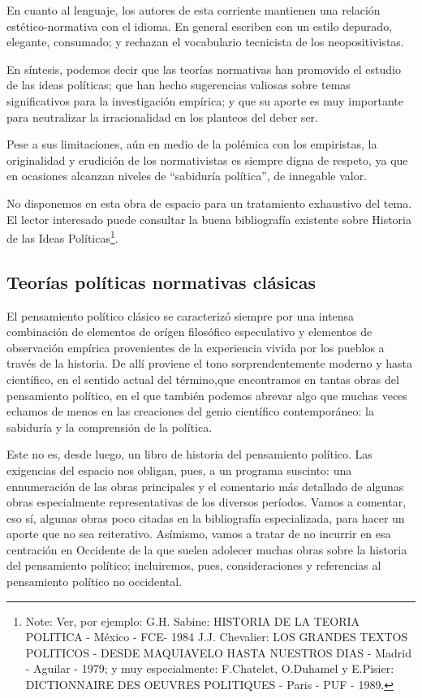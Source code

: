 \documentclass[
]{book}
\begin{document}
En cuanto al lenguaje, los autores de esta corriente mantienen una relación estético-normativa con el idioma. En general escriben con un estilo depurado, elegante, consumado; y rechazan el vocabulario tecnicista de los neopositivistas.

En síntesis, podemos decir que las teorías normativas han promovido el estudio de las ideas políticas; que han hecho sugerencias valiosas sobre temas significativos para la investigación empírica; y que su aporte es muy importante para neutralizar la irracionalidad en los planteos del deber ser.

Pese a sus limitaciones, aún en medio de la polémica con los empiristas, la originalidad y erudición de los normativistas es siempre digna de respeto, ya que en ocasiones alcanzan niveles de ``sabiduría política'', de innegable valor.

No disponemos en esta obra de espacio para un tratamiento exhaustivo del tema. El lector interesado puede consultar la buena bibliografía existente sobre Historia de las Ideas Políticas\footnote{Note: Ver, por ejemplo: G.H. Sabine: HISTORIA DE LA TEORIA POLITICA - México - FCE- 1984 J.J. Chevalier: LOS GRANDES TEXTOS POLITICOS - DESDE MAQUIAVELO HASTA NUESTROS DIAS - Madrid - Aguilar - 1979; y muy especialmente: F.Chatelet, O.Duhamel y E.Pisier: DICTIONNAIRE DES OEUVRES POLITIQUES - Paris - PUF - 1989.}.

\hypertarget{teoruxedas-poluxedticas-normativas-cluxe1sicas}{%
\subsection*{Teorías políticas normativas clásicas}\label{teoruxedas-poluxedticas-normativas-cluxe1sicas}}

El pensamiento político clásico se caracterizó siempre por una intensa combinación de elementos de orígen filosófico especulativo y elementos de observación empírica provenientes de la experiencia vivida por los pueblos a través de la historia. De allí proviene el tono sorprendentemente moderno y hasta científico, en el sentido actual del término,que encontramos en tantas obras del pensamiento político, en el que también podemos abrevar algo que muchas veces echamos de menos en las creaciones del genio científico contemporáneo: la sabiduría y la comprensión de la política.

Este no es, desde luego, un libro de historia del pensamiento político. Las exigencias del espacio nos obligan, pues, a un programa suscinto: una ennumeración de las obras principales y el comentario más detallado de algunas obras especialmente representativas de los diversos períodos. Vamos a comentar, eso sí, algunas obras poco citadas en la bibliografía especializada, para hacer un aporte que no sea reiterativo. Asímismo, vamos a tratar de no incurrir en esa centración en Occidente de la que suelen adolecer muchas obras sobre la historia del pensamiento político; incluiremos, pues, consideraciones y referencias al pensamiento político no occidental.
\end{document}
